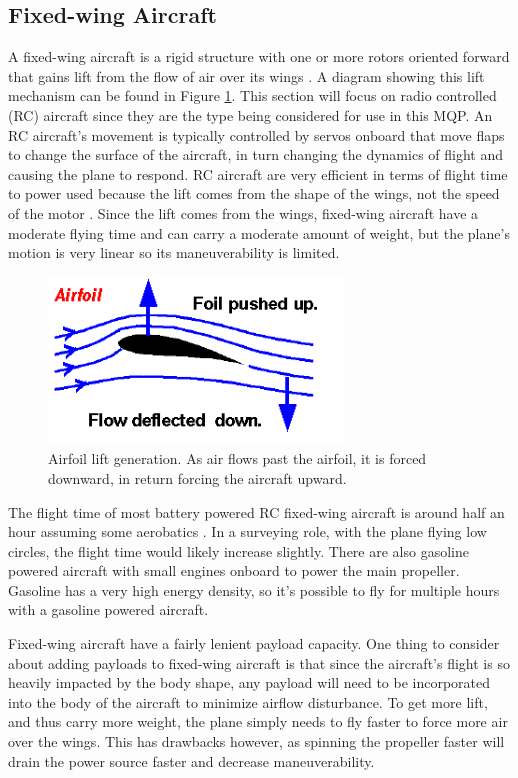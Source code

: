 \subsection{Fixed-wing Aircraft}
A fixed-wing aircraft is a rigid structure with one or more rotors oriented forward that gains lift from the flow of air over its wings \cite{airplane_book}. A diagram showing this lift mechanism can be found in Figure \ref{fig:airfoil_lift}. This section will focus on radio controlled (RC) aircraft since they are the type being considered for use in this MQP. An RC aircraft’s movement is typically controlled by servos onboard that move flaps to change the surface of the aircraft, in turn changing the dynamics of flight and causing the plane to respond. RC aircraft are very efficient in terms of flight time to power used because the lift comes from the shape of the wings, not the speed of the motor \cite{airplane_site}. Since the lift comes from the wings, fixed-wing aircraft have a moderate flying time and can carry a moderate amount of weight, but the plane’s motion is very linear so its maneuverability is limited.\par
\begin{figure}[ht]
\centering
\includegraphics[width=0.70\textwidth]{img/airfoil_lift.png}
\caption{Airfoil lift generation. As air flows past the airfoil, it is forced downward, in return forcing the aircraft upward.}
\label{fig:airfoil_lift}
\end{figure}\par
The flight time of most battery powered RC fixed-wing aircraft is around half an hour assuming some aerobatics \cite{airplane_book}. In a surveying role, with the plane flying low circles, the flight time would likely increase slightly. There are also gasoline powered aircraft with small engines onboard to power the main propeller. Gasoline has a very high energy density, so it’s possible to fly for multiple hours with a gasoline powered aircraft.\par
Fixed-wing aircraft have a fairly lenient payload capacity. One thing to consider about adding payloads to fixed-wing aircraft is that since the aircraft’s flight is so heavily impacted by the body shape, any payload will need to be incorporated into the body of the aircraft to minimize airflow disturbance. To get more lift, and thus carry more weight, the plane simply needs to fly faster to force more air over the wings. This has drawbacks however, as spinning the propeller faster will drain the power source faster and decrease maneuverability.\par
